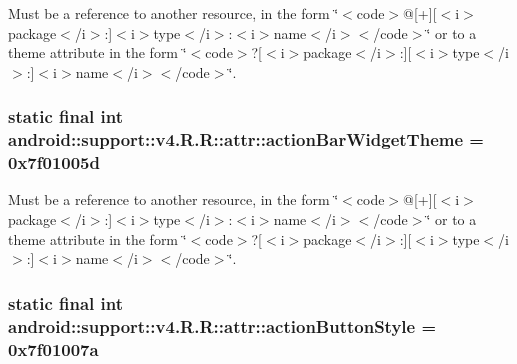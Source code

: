 Must be a reference to another resource, in the form \char`\"{}$<$code$>$@\mbox{[}+\mbox{]}\mbox{[}$<$i$>$package$<$/i$>$:\mbox{]}$<$i$>$type$<$/i$>$:$<$i$>$name$<$/i$>$$<$/code$>$\char`\"{} or to a theme attribute in the form \char`\"{}$<$code$>$?\mbox{[}$<$i$>$package$<$/i$>$:\mbox{]}\mbox{[}$<$i$>$type$<$/i$>$:\mbox{]}$<$i$>$name$<$/i$>$$<$/code$>$\char`\"{}. \hypertarget{classandroid_1_1support_1_1v4_1_1_r_1_1attr_b413037ffd60c4fee103ea1e597401b4}{
\subsubsection[{actionBarWidgetTheme}]{\setlength{\rightskip}{0pt plus 5cm}static final int android::support::v4.R.R::attr::actionBarWidgetTheme = 0x7f01005d}}
\label{classandroid_1_1support_1_1v4_1_1_r_1_1attr_b413037ffd60c4fee103ea1e597401b4}


Must be a reference to another resource, in the form \char`\"{}$<$code$>$@\mbox{[}+\mbox{]}\mbox{[}$<$i$>$package$<$/i$>$:\mbox{]}$<$i$>$type$<$/i$>$:$<$i$>$name$<$/i$>$$<$/code$>$\char`\"{} or to a theme attribute in the form \char`\"{}$<$code$>$?\mbox{[}$<$i$>$package$<$/i$>$:\mbox{]}\mbox{[}$<$i$>$type$<$/i$>$:\mbox{]}$<$i$>$name$<$/i$>$$<$/code$>$\char`\"{}. \hypertarget{classandroid_1_1support_1_1v4_1_1_r_1_1attr_e6095b7eb874ac2a50e761b6f74ab8b4}{
\subsubsection[{actionButtonStyle}]{\setlength{\rightskip}{0pt plus 5cm}static final int android::support::v4.R.R::attr::actionButtonStyle = 0x7f01007a}}
\label{classandroid_1_1support_1_1v4_1_1_r_1_1attr_e6095b7eb874ac2a50e761b6f74ab8b4}


